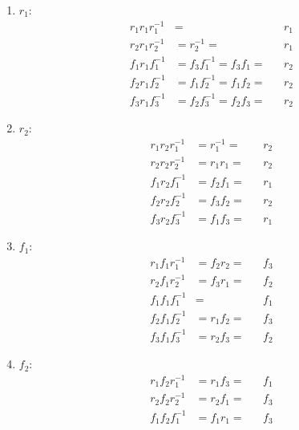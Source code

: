 \documentclass[12pt]{article}
\begin{document}
\begin{enumerate}
\begin{multicols}{2}
\begin{enumerate}
                    \item $r_1$:
                        \begin{align*}
                            r_1r_1r_1^{-1} &= &&r_1\\
                            r_2r_1r_2^{-1} &= r_2^{-1} = &&r_1\\
                            f_1r_1f_1^{-1} &= f_3f_1^{-1} = f_3f_1 = &&r_2\\
                            f_2r_1f_2^{-1} &= f_1f_2^{-1} = f_1f_2 = &&r_2\\
                            f_3r_1f_3^{-1} &= f_2f_3^{-1} = f_2f_3 = &&r_2
                        \end{align*}
                    \item $r_2$:
                        \begin{align*}
                            r_1 r_2 r_1^{-1} &= r_1^{-1} = &&r_2\\
                            r_2 r_2 r_2^{-1} &= r_1r_1 = &&r_2\\
                            f_1 r_2 f_1^{-1} &= f_2 f_1 = &&r_1\\
                            f_2 r_2 f_2^{-1} &= f_3f_2 = &&r_2\\
                            f_3 r_2 f_3^{-1} &= f_1f_3 = &&r_1
                        \end{align*}
                    \item $f_1$:
                        \begin{align*}
                            r_1 f_1 r_1^{-1} &= f_2 r_2 = &&f_3\\
                            r_2 f_1 r_2^{-1} &= f_3 r_1 =&& f_2\\
                            f_1 f_1 f_1^{-1} &= &&f_1\\
                            f_2 f_1 f_2^{-1} &= r_1f_2 =&& f_3\\
                            f_3 f_1 f_3^{-1} &= r_2f_3 = &&f_2
                        \end{align*}
                    \item $f_2$:
                        \begin{align*}
                            r_1 f_2 r_1^{-1} &= r_1 f_3 = &&f_1\\
                            r_2 f_2 r_2^{-1} &= r_2 f_1 = &&f_3\\
                            f_1 f_2 f_1^{-1} &= f_1 r_1 = &&f_3 \\

\end{align*}
\end{enumerate}
\end{multicols}
\end{enumerate}
\end{document}
